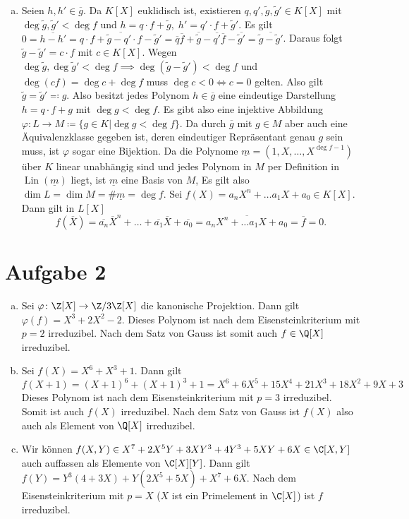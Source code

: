 \documentclass{article}
\begin{document}
\begin{enumerate}[(a)]
        \item Seien $h,h' \in \overline{g}$. Da $K[X]$ euklidisch ist, existieren $q, q', \tilde g, \tilde g'\in K[X]$ mit $\deg \tilde g, \tilde g' < \deg f$ und $h = q\cdot f + \tilde g,\; h' = q'\cdot f + \tilde g'$. Es gilt $0 = \overline{h - h'} = \overline{q\cdot f + \tilde g - q'\cdot f - \tilde g'} = \overline{q}\overline{f} + \overline{\tilde g} - \overline{q'}\overline{f} - \overline{\tilde g'} = \overline{\tilde g - \tilde g'}$. Daraus folgt $\tilde g - \tilde g' = c\cdot f$ mit $c\in K[X]$. Wegen $\deg \tilde g, \deg \tilde g' < \deg f \implies \deg (\tilde g - \tilde g') < \deg f $ und $\deg(cf) = \deg c + \deg f$ muss $\deg c < 0 \Leftrightarrow c = 0$ gelten. Also gilt $\tilde g = \tilde g' \eqqcolon g$. Also besitzt jedes Polynom $h\in \overline{g}$ eine eindeutige Darstellung $h = q\cdot f + g$ mit $\deg g < \deg f$. Es gibt also eine injektive Abbildung $\varphi\colon L \to M\coloneqq \{g \in K| \deg g < \deg f\}$. Da durch $\overline{g}$ mit $g \in M$ aber auch eine Äquivalenzklasse gegeben ist, deren eindeutiger Repräsentant genau $g$ sein muss, ist $\varphi$ sogar eine Bijektion. Da die Polynome $\underline{m} = (1, X, \dots, X^{\deg f - 1})$ über $K$ linear unabhängig sind und jedes Polynom in $M$ per Definition in $\operatorname{Lin}(\underline{m})$ liegt, ist $\underline{m}$ eine Basis von $M$, Es gilt also $\dim L = \dim M = \# \underline{m} = \deg f$.
        Sei $f(X) = a_n X^n + \dots a_1 X + a_0 \in K[X]$. Dann gilt in $L[X]$
        \[
            f(\overline{X}) = \overline{a_n} \overline{X}^n + \dots + \overline{a_1}\overline{X} + \overline{a_0} = \overline{a_n X^n + \dots a_1 X + a_0} = \overline{f} = 0.
        \]
    \end{enumerate}
    \section*{Aufgabe 2}
    \begin{enumerate}[(a)]
        \item Sei $\varphi \colon \Z[X] \to \Z/3\Z[X]$ die kanonische Projektion. Dann gilt $\varphi(f) = X^3 + 2X^2 - 2$. Dieses Polynom ist nach dem Eisensteinkriterium mit $p = 2$ irreduzibel. Nach dem Satz von Gauss ist somit auch $f\in \Q[X]$ irreduzibel.
        \item Sei $f(X) = X^6 + X^3 + 1$. Dann gilt 
        \[
            f(X + 1) = (X + 1)^6 + (X + 1)^3 + 1 = X^6 + 6X^5 + 15X^4 + 21X^3 + 18X^2 + 9 X + 3  
        \]
        Dieses Polynom ist nach dem Eisensteinkriterium mit $p = 3$ irreduzibel. Somit ist auch $f(X)$ irreduzibel. Nach dem Satz von Gauss ist $f(X)$ also auch als Element von $\Q[X]$ irreduzibel.
        \item Wir können $f(X,Y) \in X^7 + 2X^5 Y + 3XY^3 + 4Y^3 + 5XY + 6X \in \C[X,Y]$ auch auffassen als Elemente von $\C[X][Y]$. Dann gilt $f(Y) = Y^3(4 + 3X) + Y(2X^5 + 5X) + X^7 + 6X$. Nach dem Eisensteinkriterium mit $p = X$ ($X$ ist ein Primelement in $\C[X]$) ist $f$ irreduzibel.
    \end{enumerate}
\end{document}
